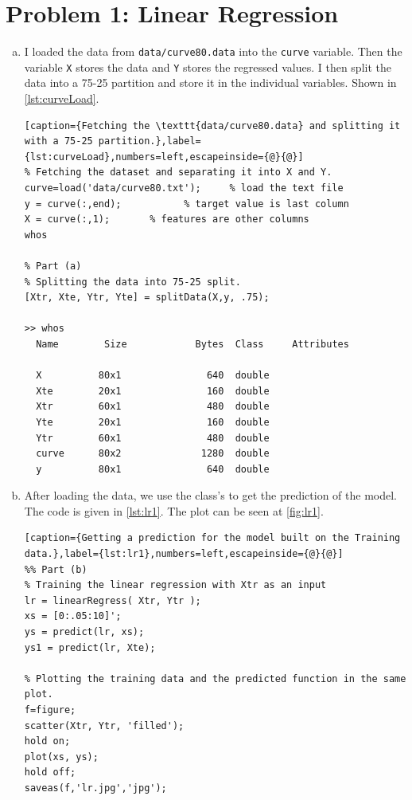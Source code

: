 \documentclass[a4paper, 11pt]{article}
\begin{document}
\section*{Problem 1: Linear Regression}
\begin{enumerate}[(a)]
\item I loaded the data from \texttt{data/curve80.data} into the \texttt{curve} variable. Then the variable \texttt{X} stores the data and \texttt{Y} stores the regressed values. I then split the data into a 75-25 partition and store it in the individual variables. Shown in \autoref{lst:curveLoad}.
\vspace{-15pt}
\begin{lstlisting}[caption={Fetching the \texttt{data/curve80.data} and splitting it with a 75-25 partition.},label={lst:curveLoad},numbers=left,escapeinside={@}{@}]
% Fetching the dataset and separating it into X and Y.
curve=load('data/curve80.txt');     % load the text file
y = curve(:,end);           % target value is last column
X = curve(:,1);       % features are other columns
whos

% Part (a)
% Splitting the data into 75-25 split.
[Xtr, Xte, Ytr, Yte] = splitData(X,y, .75);

>> whos
  Name        Size            Bytes  Class     Attributes

  X          80x1               640  double              
  Xte        20x1               160  double              
  Xtr        60x1               480  double              
  Yte        20x1               160  double              
  Ytr        60x1               480  double              
  curve      80x2              1280  double              
  y          80x1               640  double 
\end{lstlisting}

\item After loading the data, we use the  class's  to get the prediction of the model. The code is given in \autoref{lst:lr1}. The plot can be seen at \autoref{fig:lr1}.
\vspace{-15pt}
\begin{lstlisting}[caption={Getting a prediction for the model built on the Training data.},label={lst:lr1},numbers=left,escapeinside={@}{@}]
%% Part (b)
% Training the linear regression with Xtr as an input
lr = linearRegress( Xtr, Ytr );
xs = [0:.05:10]';
ys = predict(lr, xs);
ys1 = predict(lr, Xte);

% Plotting the training data and the predicted function in the same plot.
f=figure;
scatter(Xtr, Ytr, 'filled');
hold on;
plot(xs, ys);
hold off;
saveas(f,'lr.jpg','jpg');


\end{lstlisting}
\end{enumerate}
\end{document}
